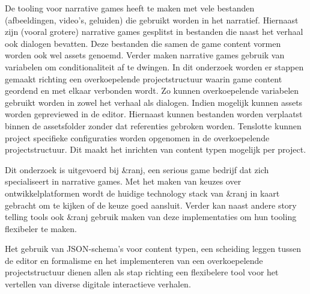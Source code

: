 De tooling voor narrative games heeft te maken met vele bestanden (afbeeldingen, video’s, geluiden) die gebruikt worden in het narratief. Hiernaast zijn (vooral grotere) narrative games gesplitst in bestanden die naast het verhaal ook dialogen bevatten. Deze bestanden die samen de game content vormen worden ook wel assets genoemd. Verder maken narrative games gebruik van variabelen om conditionaliteit af te dwingen. In dit onderzoek worden er stappen gemaakt richting een overkoepelende projectstructuur waarin game content geordend en met elkaar verbonden wordt. Zo kunnen overkoepelende variabelen gebruikt worden in zowel het verhaal als dialogen. Indien mogelijk kunnen assets worden gepreviewed in de editor. Hiernaast kunnen bestanden worden verplaatst binnen de assetsfolder zonder dat referenties gebroken worden. Tenslotte kunnen project specifieke configuraties worden opgenomen in de overkoepelende projectstructuur. Dit maakt het inrichten van content typen mogelijk per project.

Dit onderzoek is uitgevoerd bij \&ranj, een serious game bedrijf dat zich specialiseert in narrative games. Met het maken van keuzes over ontwikkelplatformen wordt de huidige technology stack van \&ranj in kaart gebracht om te kijken of de keuze goed aansluit. Verder kan naast andere story telling tools ook \&ranj gebruik maken van deze implementaties om hun tooling flexibeler te maken.

Het gebruik van JSON-schema’s voor content typen, een scheiding leggen tussen de editor en formalisme en het implementeren van een overkoepelende projectstructuur dienen allen als stap richting een flexibelere tool voor het vertellen van diverse digitale interactieve verhalen.